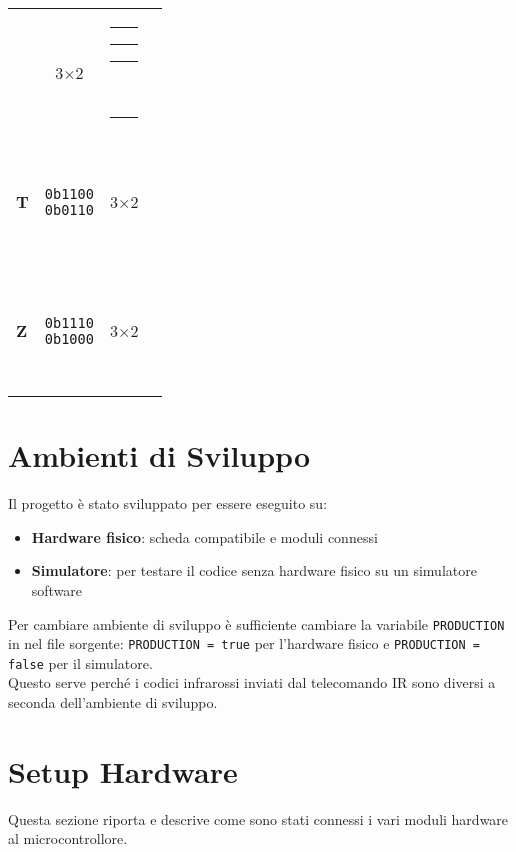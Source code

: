 \documentclass[a4paper, 12pt]{article}
\newcommand{\RedBlock}{\colorbox{red}{\rule{1.2ex}{1.2ex}}}      %
\newcommand{\WhiteBlock}{\fcolorbox{black}{white}{\rule{1.2ex}{1.2ex}}} %
\begin{document}
\begin{table}[H]
\begin{tabular}{
            >{\bfseries}l   %
            c               %
            c               %
            l               %
        }
              & 3\(\times\)2
              & \makecell{\WhiteBlock\RedBlock\RedBlock\RedBlock                          \\\WhiteBlock\WhiteBlock\RedBlock\WhiteBlock} \\
        \addlinespace
        T     & \makecell{\texttt{0b1100}                                                 \\\texttt{0b0110}}
              & 3\(\times\)2
              & \makecell{\RedBlock\RedBlock\WhiteBlock\WhiteBlock                        \\\WhiteBlock\RedBlock\RedBlock\WhiteBlock} \\
        \addlinespace
        Z     & \makecell{\texttt{0b1110}                                                 \\\texttt{0b1000}}
              & 3\(\times\)2
              & \makecell{\RedBlock\RedBlock\RedBlock\WhiteBlock                          \\\RedBlock\WhiteBlock\WhiteBlock\WhiteBlock} \\
        \bottomrule
    \end{tabular}
\end{table}

\section{Ambienti di Sviluppo}
Il progetto è stato sviluppato per essere eseguito su:
\begin{itemize}
    \item \textbf{Hardware fisico}: scheda compatibile e moduli connessi
    \item \textbf{Simulatore}: per testare il codice senza hardware fisico su un simulatore software
\end{itemize}
Per cambiare ambiente di sviluppo è sufficiente cambiare la variabile \texttt{PRODUCTION} in nel file sorgente: \texttt{PRODUCTION = true} per l'hardware fisico e \texttt{PRODUCTION = false} per il simulatore.\\
Questo serve perché i codici infrarossi inviati dal telecomando IR sono diversi a seconda dell'ambiente di sviluppo.\\

\section{Setup Hardware}
Questa sezione riporta e descrive come sono stati connessi i vari moduli hardware al microcontrollore.
\end{document}
